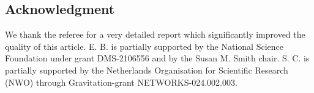 \documentclass[11pt]{article}
\begin{document}
\subsection*{Acknowledgment}We thank the referee for a very detailed report which significantly improved the quality of this article. 
E. B. is partially supported by the National Science Foundation under grant DMS-2106556 and by the Susan M. Smith chair. S. C. is partially supported by the Netherlands Organisation for Scientific Research (NWO) through Gravitation-grant NETWORKS-024.002.003.


\end{document}
